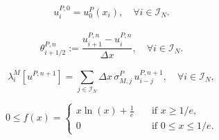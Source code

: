 \documentclass[10pt,a4paper]{amsart}
\newcommand{\I}{\mathcal{I}_N}
\begin{document}
\begin{align}\label{schemeIC}
u_i^{P, 0} =  u^P_0(x_i), \quad \forall i \in \I.
\end{align}

\begin{align}\label{def.dis.grad}
    \theta^{P,n}_{i+1/2} := \dfrac{u^{P,n}_{i+1}-u^{P,n}_i}{\Delta x}, \quad \forall i\in\I.
\end{align}

  \begin{equation}\label{h(x)}
  \lambda^M_i \left[u^{P, n + 1}\right]= \sum_{j \in \I} \Delta x \, \sigma_{M,j}^P \, u^{P, n + 1}_{i - j}, \quad \forall i \in \I, 
 \end{equation}

\begin{equation}\label{1.deff}
    0 \leq f(x) = \begin{cases}
        x \ln(x) + \frac{1}{e} & \quad\mbox{if } x\geq 1/e,\\
        0  & \quad \mbox{if } 0 \leq x \leq  1/e.
    \end{cases}          
\end{equation}
\end{document}
